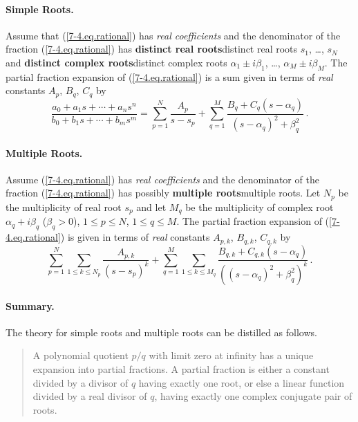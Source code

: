 \documentclass{article}
\def\df{\bfseries}
\def\DF#1{{\df #1}\XX{#1}}
\def\XX{}
\def\rf#1{(\ref{#1})}
\def\EM#1{{\mdseries\itshape #1}}
\def\Paragraph#1{\paragraph{#1.}}
\newenvironment{SuperQuote}{\begin{quote}\large\sf}{\end{quote}}
\begin{document}
\Paragraph{Simple Roots} Assume that \rf{7-4.eq.rational} has
\EM{real coefficients} and the denominator of the fraction
\rf{7-4.eq.rational} has \DF{distinct real roots} $s_1$, \ldots,
$s_N$ and \DF{distinct complex roots} $\alpha_1\pm i\beta_1$,
\ldots, $\alpha_M\pm i\beta_M$. The partial fraction expansion of
\rf{7-4.eq.rational} is a sum given in terms of \EM{real}
constants $A_p$, $B_q$, $C_q$ by
\begin{equation}\label{7-4.eq.simple-roots}
 \frac{a_0+a_1s+\cdots + a_ns^n}{b_0+b_1s+\cdots+b_ms^m}
=
\sum_{p=1}^N
\frac{A_p}{s-s_p} + \sum_{q=1}^M
\frac{B_q+C_q(s-\alpha_q)}{(s-\alpha_q)^2+\beta_q^2}\,.
\end{equation}


\Paragraph{Multiple Roots} Assume \rf{7-4.eq.rational} has
\EM{real coefficients} and the denominator of the fraction
\rf{7-4.eq.rational} has possibly \DF{multiple roots}. Let $N_p$
be the multiplicity of real root $s_p$ and let $M_q$ be the
multiplicity of complex root $\alpha_q+i\beta_q$ ($\beta_q>0$),
$1\le p \le N$, $1\le q \le M$. The partial fraction expansion of
\rf{7-4.eq.rational} is given in terms of \EM{real} constants
$A_{p,k}$, $B_{q,k}$, $C_{q,k}$ by
\begin{equation}\label{7-4.eq.multiple-roots}
\sum_{p=1}^N \sum_{1\le k\le N_p}
\frac{A_{p,k}}{(s-s_p)^k} + \sum_{q=1}^M \sum_{1\le k\le M_q}
\frac{B_{q,k}+C_{q,k}(s-\alpha_q)}{((s-\alpha_q)^2+\beta_q^2)^k}\,.
\end{equation}
\Paragraph{Summary} The theory for simple roots and multiple roots
can be distilled as follows.
\begin{SuperQuote}
A polynomial quotient $p/q$ with limit zero at infinity has a
unique expansion into partial fractions. A partial fraction is
either a constant divided by a divisor of $q$ having exactly one
root, or else a linear function divided by a real divisor of $q$,
having exactly one complex conjugate pair of roots.
\end{SuperQuote}
\end{document}

